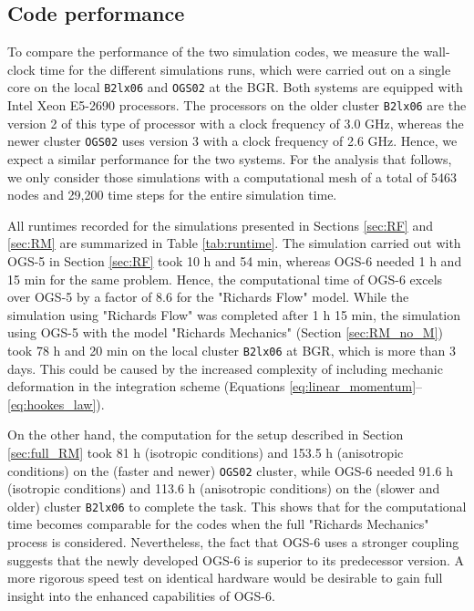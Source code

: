 \subsection{Code performance}

To compare the performance of the two simulation codes, we measure the wall-clock time for the different simulations runs, which were carried out on a single core on the local \texttt{B2lx06} and \texttt{OGS02} at the BGR. Both systems are equipped with Intel Xeon E5-2690 processors. The processors on the older cluster \texttt{B2lx06} are the version 2 of this type of processor with a clock frequency of  3.0 GHz, whereas the newer cluster \texttt{OGS02} uses version 3 with a clock frequency of 2.6 GHz. Hence, we expect a similar performance for the two systems. For the analysis that follows, we only consider those simulations with a computational mesh of a total of 5463 nodes and 29,200 time steps for the entire simulation time. 

All runtimes recorded for the simulations presented in Sections \ref{sec:RF} and \ref{sec:RM} are summarized in Table \ref{tab:runtime}. The simulation carried out with OGS-5 in Section \ref{sec:RF} took 10 h and 54 min, whereas OGS-6 needed 1 h and 15 min for the same problem. Hence, the computational time of OGS-6 excels over OGS-5 by a factor of 8.6 for the "Richards Flow" model. While the simulation using "Richards Flow" was completed after 1 h 15 min, the simulation using OGS-5 with the model "Richards Mechanics" (Section \ref{sec:RM_no_M}) took 78 h and 20 min on the local cluster \texttt{B2lx06} at BGR, which is more than 3 days. This could be caused by the increased complexity of including mechanic deformation in the integration scheme (Equations \eqref{eq:linear_momentum}--\eqref{eq:hookes_law}). 

On the other hand, the computation for the setup described in Section \ref{sec:full_RM} took 81 h (isotropic conditions) and 153.5 h (anisotropic conditions) on the (faster  and newer) \texttt{OGS02} cluster, while OGS-6 needed 91.6 h (isotropic conditions) and 113.6 h (anisotropic conditions) on the (slower and older) cluster \texttt{B2lx06} to complete the task. This shows that for the computational time becomes comparable for the codes when the full "Richards Mechanics" process is considered. Nevertheless, the fact that OGS-6 uses a stronger coupling suggests that the newly developed OGS-6 is superior to its predecessor version.  A more rigorous speed test on identical hardware would be desirable to gain full insight into the enhanced capabilities of OGS-6.

